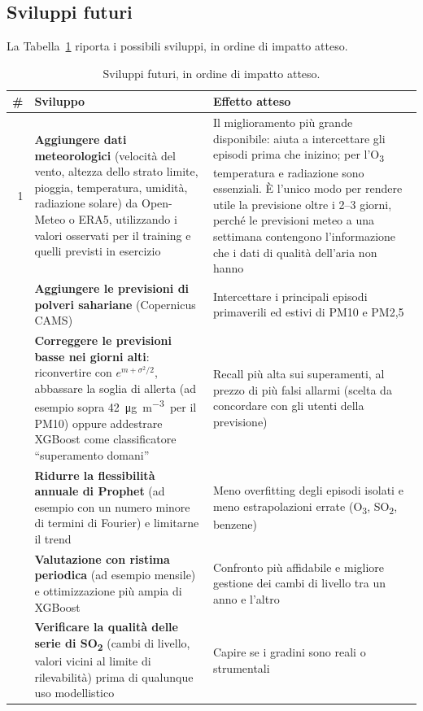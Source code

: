 \documentclass[11pt]{report}
\newcommand{\ugm}{\si{\micro\gram\per\cubic\metre}}
\begin{document}
\subsection{Sviluppi futuri}
La Tabella~\ref{tab:fc_sviluppi} riporta i possibili sviluppi, in ordine di impatto
atteso.

\begin{table}[H]
  \centering
  \caption{Sviluppi futuri, in ordine di impatto atteso.}
  \label{tab:fc_sviluppi}
  \small
  \begin{tabularx}{\textwidth}{@{}r >{\raggedright\arraybackslash}X >{\raggedright\arraybackslash}X@{}}
    \toprule
    \textbf{\#} & \textbf{Sviluppo} & \textbf{Effetto atteso} \\
    \midrule
    1 & \textbf{Aggiungere dati meteorologici} (velocità del vento, altezza dello strato limite, pioggia, temperatura, umidità, radiazione solare) da Open-Meteo o ERA5, utilizzando i valori osservati per il training e quelli previsti in esercizio & Il miglioramento più grande disponibile: aiuta a intercettare gli episodi prima che inizino; per l'O\textsubscript{3} temperatura e radiazione sono essenziali. È l'unico modo per rendere utile la previsione oltre i 2--3 giorni, perché le previsioni meteo a una settimana contengono l'informazione che i dati di qualità dell'aria non hanno \\
    \addlinespace
    2 & \textbf{Aggiungere le previsioni di polveri sahariane} (Copernicus CAMS) & Intercettare i principali episodi primaverili ed estivi di PM10 e PM2,5 \\
    \addlinespace
    3 & \textbf{Correggere le previsioni basse nei giorni alti}: riconvertire con $e^{m+\sigma^2/2}$, abbassare la soglia di allerta (ad esempio sopra 42~\ugm\ per il PM10) oppure addestrare XGBoost come classificatore ``superamento domani'' & Recall più alta sui superamenti, al prezzo di più falsi allarmi (scelta da concordare con gli utenti della previsione) \\
    \addlinespace
    4 & \textbf{Ridurre la flessibilità annuale di Prophet} (ad esempio con un numero minore di termini di Fourier) e limitarne il trend & Meno overfitting degli episodi isolati e meno estrapolazioni errate (O\textsubscript{3}, SO\textsubscript{2}, benzene) \\
    \addlinespace
    5 & \textbf{Valutazione con ristima periodica} (ad esempio mensile) e ottimizzazione più ampia di XGBoost & Confronto più affidabile e migliore gestione dei cambi di livello tra un anno e l'altro \\
    \addlinespace
    6 & \textbf{Verificare la qualità delle serie di SO\textsubscript{2}} (cambi di livello, valori vicini al limite di rilevabilità) prima di qualunque uso modellistico & Capire se i gradini sono reali o strumentali \\
    \bottomrule
  \end{tabularx}
\end{table}
\end{document}
